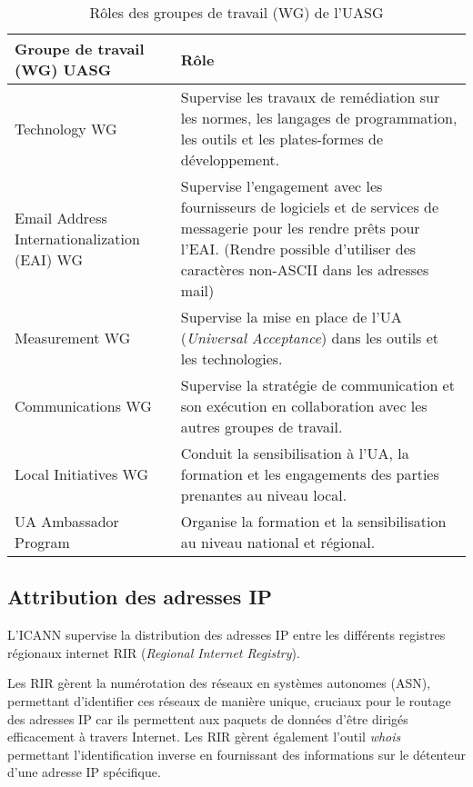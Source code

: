 \documentclass{cs-mpi}
\begin{document}
\begin{table}[h]
    \centering
    \renewcommand{\arraystretch}{1.5} %
    \setlength{\tabcolsep}{12pt} %

    \begin{tabular}{|p{4cm}|p{9cm}|}
        \hline
        \textbf{Groupe de travail (WG) UASG} & \textbf{Rôle} \\
        \hline
        Technology WG & Supervise les travaux de remédiation sur les normes, les langages de programmation, les outils et les plates-formes de développement. \\
        \hline
        Email Address Internationalization (EAI) WG & Supervise l'engagement avec les fournisseurs de logiciels et de services de messagerie pour les rendre prêts pour l'EAI. (Rendre possible d'utiliser des caractères non-ASCII dans les adresses mail)\\
        \hline
        Measurement WG & Supervise la mise en place de l'UA (\emph{Universal Acceptance}) dans les outils et les technologies. \\
        \hline
        Communications WG & Supervise la stratégie de communication et son exécution en collaboration avec les autres groupes de travail. \\
        \hline
        Local Initiatives WG & Conduit la sensibilisation à l'UA, la formation et les engagements des parties prenantes au niveau local. \\
        \hline
        UA Ambassador Program & Organise la formation et la sensibilisation au niveau national et régional. \\
        \hline
    \end{tabular}

    \caption{Rôles des groupes de travail (WG) de l'UASG}
    \label{tab:uasg_roles}
\end{table}

\subsection{Attribution des adresses IP}
L'ICANN supervise la distribution des adresses IP entre les différents registres régionaux internet RIR (\emph{Regional Internet Registry}).

Les RIR gèrent la numérotation des réseaux en systèmes autonomes (ASN), permettant d'identifier ces réseaux de manière unique, cruciaux pour le routage des adresses IP car ils permettent aux paquets de données d'être dirigés efficacement à travers Internet. Les RIR gèrent également l'outil \emph{whois} permettant l'identification inverse en fournissant des informations sur le détenteur d'une adresse IP spécifique.
\end{document}

